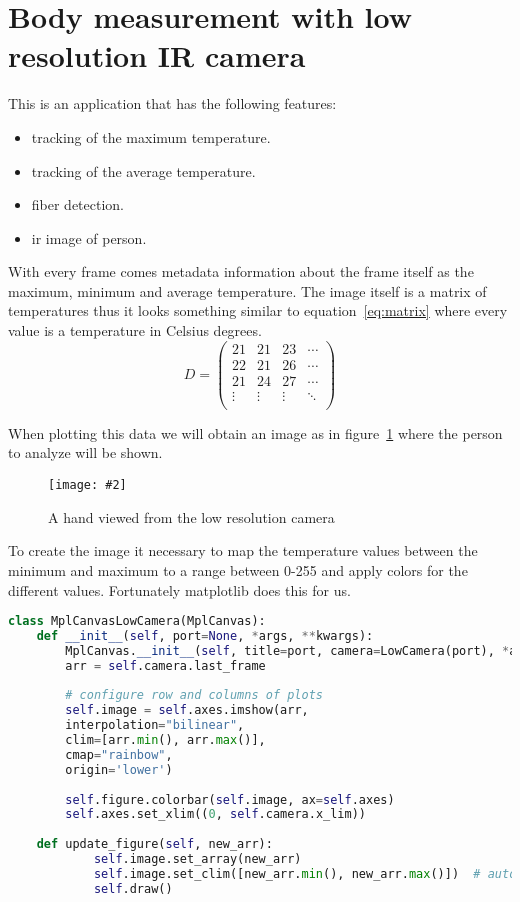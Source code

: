 \documentclass[hidelinks,11pt,a4paper,oneside,article]{memoir}
\newcommand{\putimage}[3][10] %
{
\begin{figure}[h]
    \centering
    \captionsetup{justification=centering}
    \texttt{[image: \#2]}
    \caption{#3}
    \label{fig:#2}
\end{figure}
}
\begin{document}
\section{Body measurement with low resolution IR camera}
This is an application that has the following features:
\begin{itemize}
    \item tracking of the maximum temperature.
    \item tracking of the average temperature.
    \item fiber detection.
    \item \gls{ir} image of person.
\end{itemize}
With every frame comes metadata information about the frame itself as the maximum, minimum and average temperature. The image itself is a matrix of temperatures thus it looks something similar to equation~\ref{eq:matrix} where every value is a temperature in Celsius degrees.
\begin{equation}
\label{eq:matrix}
D = 
\begin{pmatrix}
21 & 21 & 23 & \cdots \\
22 & 21 & 26 & \cdots \\
21 & 24 & 27 & \cdots \\
\vdots & \vdots  & \vdots  & \ddots   \\

\end{pmatrix}
\end{equation}

When plotting this data we will obtain an image as in figure~\ref{fig:ir-hand} where the person to analyze will be shown.

    \putimage{ir-hand}{A hand viewed from the low resolution camera}

To create the image it necessary to map the temperature values between the minimum and maximum to a range between 0-255 and apply colors for the different values. Fortunately matplotlib does this for us.

\begin{lstlisting}[label={listing:image},caption={Class to get serial data from the cameras},language=Python, style=styleprogramming]
class MplCanvasLowCamera(MplCanvas):
    def __init__(self, port=None, *args, **kwargs):
        MplCanvas.__init__(self, title=port, camera=LowCamera(port), *args, **kwargs)
        arr = self.camera.last_frame
        
        # configure row and columns of plots
        self.image = self.axes.imshow(arr,
        interpolation="bilinear",
        clim=[arr.min(), arr.max()],
        cmap="rainbow",
        origin='lower')
        
        self.figure.colorbar(self.image, ax=self.axes)
        self.axes.set_xlim((0, self.camera.x_lim))
    
    def update_figure(self, new_arr):
            self.image.set_array(new_arr)
            self.image.set_clim([new_arr.min(), new_arr.max()])  # autoscale
            self.draw()

\end{lstlisting}
\end{document}
